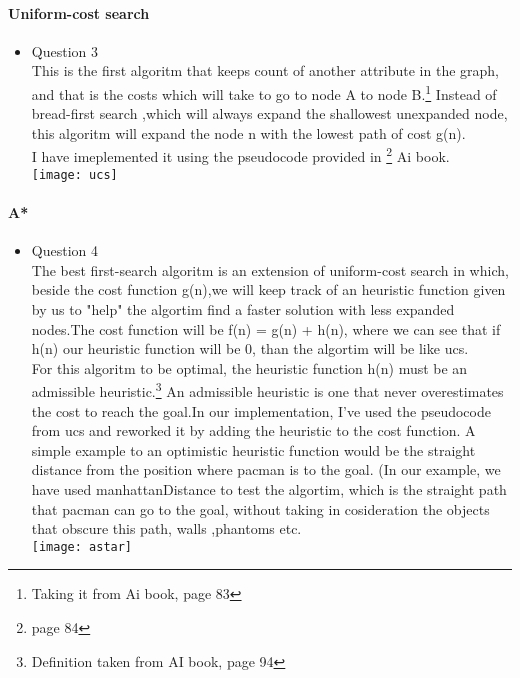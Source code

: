 \paragraph{Uniform-cost search}
\begin{itemize}
\item{Question 3}\\

	\tab This is the first algoritm that keeps count of another attribute in the graph, and that is the costs which will take to go to node A to node B.\footnote{Taking it from Ai book, page 83} Instead of bread-first search ,which will always expand the shallowest unexpanded node, this algoritm will expand the node n with the lowest path of cost g(n).\\
	\tab I have imeplemented it using the pseudocode provided in \footnote{page 84} Ai book.\\

\texttt{[image: ucs]}
\end{itemize}


\paragraph{A*}
\begin{itemize}
\item{Question 4}\\

	\tab The best first-search algoritm is an extension of uniform-cost search in which, beside the cost function g(n),we will keep track of an heuristic function given by us to "help" the algortim find a faster solution with less expanded nodes.The cost function will be f(n) = g(n) + h(n), where we can see that if h(n) our heuristic function will be 0, than the algortim will be like ucs.\\
	\tab For this algoritm to be optimal, the heuristic function h(n) must be an admissible heuristic.\footnote{Definition taken from AI book, page 94} An admissible heuristic is one that never overestimates the 	cost to reach the goal.In our implementation, I've used the pseudocode from ucs and reworked it by adding the heuristic to the cost function. A simple example to an optimistic heuristic function would be the straight distance from the position where pacman is to the goal. (In our example, we have used manhattanDistance to test the algortim, which is the straight path that pacman can go to the goal, without taking in cosideration the objects that obscure this path, walls ,phantoms etc.\\

\texttt{[image: astar]}
\end{itemize}


